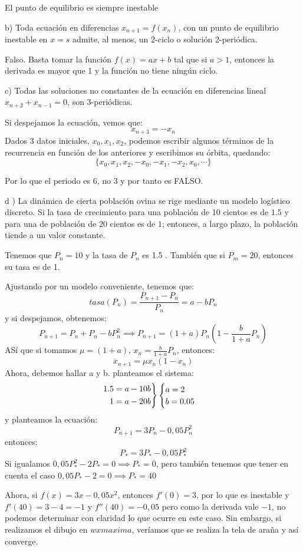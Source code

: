 \documentclass[11pt, a4paper, titlepage]{article}
\theoremstyle{theorem-style}
\theoremstyle{definition-style}
\theoremstyle{remark-style}
\theoremstyle{example-style}
\newenvironment{rcases}
  {\left.\begin{aligned}}
  {\end{aligned}\right\rbrace}
\begin{document}
El punto de equilibrio es siempre inestable


b) Toda ecuación en diferencias $x _{n+1} = f (x_n)$, con un punto de equilibrio inestable en $x = s$ admite, al menos,
un 2-ciclo o solución 2-periódica.

Falso. Basta tomar la función $f(x) = ax+b$ tal que si $a>1$, entonces la derivada es mayor que 1 y la función no tiene ningún ciclo.

c) Todas las soluciones no constantes de la ecuación en diferencias lineal $x_{n+2}+ x_{n-1} = 0$, son 3-periódicas.

Si despejamos la ecuación, vemos que:
\[
x_{n+3} = -x_n
\]
Dados 3 datos iniciales, $x_0,x_1,x_2$, podemos escribir algunos términos de la recurrencia en función de los anteriores y escribimos su órbita, quedando:
\[
\{x_0,x_1,x_2,-x_0,-x_1,-x_2,x_0,\cdots\}
\]

Por lo que el periodo es 6, no 3 y por tanto es FALSO.

d ) La dinámica de cierta población ovina se rige mediante un modelo logístico discreto. Si la tasa de crecimiento
para una población de 10 cientos es de $1.5$ y para una de población de 20 cientos es de $1$; entonces, a largo plazo, la población tiende a un valor constante.

Tenemos que $P_n=10$ y la tasa de $P_n$ es 1.5 . También que si $P_m = 20$, entonces su tasa es de 1.

Ajustando por un modelo conveniente, tenemos que:
\[
tasa(P_n) = \frac{P _{n+1} - P_n}{P_n} = a -bP_n
\]
y si despejamos, obtenemos:
\[
P _{n+1} = P_n + P_n -b P_n^2 \implies P _{n+1} = (1+a)P_n(1-\frac{b}{1+a}P_n)
\]
ASí que si tomamos $\mu = (1+a)$, $x_n = \frac{b}{1+a}P_n$, entonces:
\[
x _{n+1} = \mu x_n (1-x_n)
\]
Ahora, debemos hallar a y b. planteamos el sistema:
\[
\begin{rcases}
	1.5 = a-10b\\
	1 = a-20b
\end{rcases} 
\begin{cases}
	a = 2 \\
	b = 0.05
\end{cases}
\]
y planteamos la ecuación:
\[
P _{n+1} = 3P_n - 0,05 P_n^2
\]
entonces:
\[
P_* = 3P_* - 0,05P_*^2
\]
Si igualamos $0,05P_*^2 -2P_* = 0 \implies P_* = 0$, pero también tenemos que tener en cuenta el caso $0,05P_* - 2 = 0 \implies P_* = 40$

Ahora, si $f(x) = 3x - 0,05x^2$, entonces $f'(0) = 3$, por lo que es inestable y $f'(40) =3-4 = -1$ y $f''(40) = -0,05$
pero como la derivada vale $-1$, no podemos determinar con claridad lo que ocurre en este caso. Sin embargo, si realizamos el dibujo en $wxmaxima$, veríamos que se realiza la tela de araña y así converge.
\end{document}
